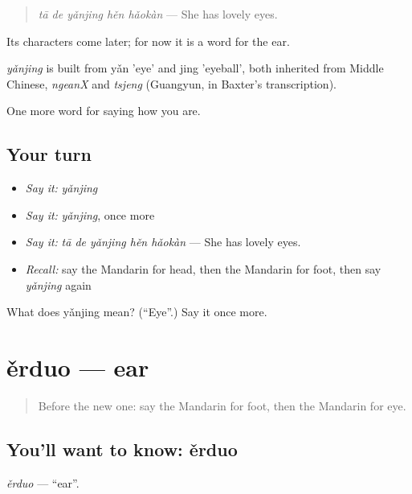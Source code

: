 \begin{quote}
\emph{tā de yǎnjing hěn hǎokàn} — She has lovely eyes.
\end{quote}

Its characters come later; for now it is a word for the ear.

\begin{cousinweb}
\emph{yǎnjing} is built from yǎn 'eye' and jing 'eyeball', both inherited from Middle Chinese, \emph{ngeanX} and \emph{tsjeng} (Guangyun, in Baxter's transcription).
\end{cousinweb}

\begin{grammarlens}[title={What you've built}]
One more word for saying how you are.
\end{grammarlens}

\subsection*{Your turn}
\begin{itemize}
\raggedright
  \item \emph{Say it:} \emph{yǎnjing}
  \item \emph{Say it:} \emph{yǎnjing}, once more
  \item \emph{Say it:} \emph{tā de yǎnjing hěn hǎokàn} — She has lovely eyes.
  \item \emph{Recall:} say the Mandarin for head, then the Mandarin for foot, then say \emph{yǎnjing} again
\end{itemize}

\begin{tcolorbox}[breakable,colback=teal!4,colframe=teal!35!black,title={Before you move on}]
What does yǎnjing mean? (\textquotedblleft{}Eye\textquotedblright{}.) Say it once more.
\end{tcolorbox}
\section[ěrduo]{ěrduo — ear}

\label{lesson:ZH-C52-erduo}



\begin{quote}
Before the new one: say the Mandarin for foot, then the Mandarin for eye.
\end{quote}

\subsection*{You'll want to know: ěrduo}
\emph{ěrduo} — \textquotedblleft{}ear\textquotedblright{}.

